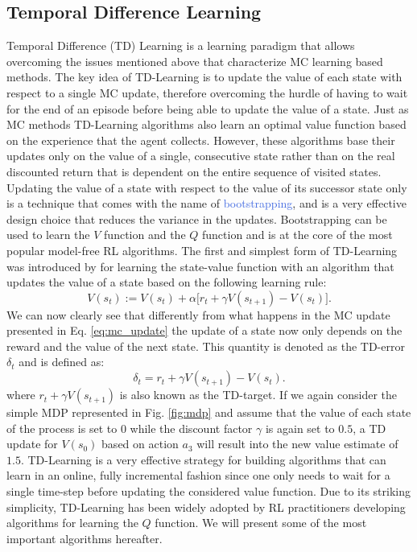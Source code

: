 \subsection{Temporal Difference Learning}
\label{sec:td_learning}
Temporal Difference (TD) Learning \cite{sutton1984temporal,sutton1988learning} is a learning paradigm that allows overcoming the issues mentioned above that characterize MC learning based methods. The key idea of TD-Learning is to update the value of each state with respect to a single MC update, therefore overcoming the hurdle of having to wait for the end of an episode before being able to update the value of a state. Just as MC methods TD-Learning algorithms also learn an optimal value function based on the experience that the agent collects. However, these algorithms base their updates only on the value of a single, consecutive state rather than on the real discounted return that is dependent on the entire sequence of visited states. Updating the value of a state with respect to the value of its successor state only is a technique that comes with the name of \textcolor{RoyalBlue}{bootstrapping}, and is a very effective design choice that reduces the variance in the updates. Bootstrapping can be used to learn the $V$ function and the $Q$ function and is at the core of the most popular model-free RL algorithms. The first and simplest form of TD-Learning was introduced by \citet{sutton1988learning} for learning the state-value function with an algorithm that updates the value of a state based on the following learning rule:
\begin{equation}
	V(s_t):= V(s_t) + \alpha \big[r_t + \gamma V(s_{t+1}) - V(s_t)\big].
	\label{eq:td_learning_v}
\end{equation}
We can now clearly see that differently from what happens in the MC update presented in Eq. \ref{eq:mc_update} the update of a state now only depends on the reward and the value of the next state. This quantity is denoted as the TD-error $\delta_t$ and is defined as:
\begin{equation}
	\delta_t = r_t + \gamma V(s_{t+1}) - V(s_t).
\end{equation}
where $r_t + \gamma V(s_{t+1})$ is also known as the TD-target.
If we again consider the simple MDP represented in Fig. \ref{fig:mdp} and assume that the value of each state of the process is set to $0$ while the discount factor $\gamma$ is again set to $0.5$, a TD update for $V(s_0)$ based on action $a_3$ will result into the new value estimate of $1.5$. 
TD-Learning is a very effective strategy for building algorithms that can learn in an online, fully incremental fashion since one only needs to wait for a single time-step before updating the considered value function. Due to its striking simplicity, TD-Learning has been widely adopted by RL practitioners developing algorithms for learning the $Q$ function. We will present some of the most important algorithms hereafter. 

